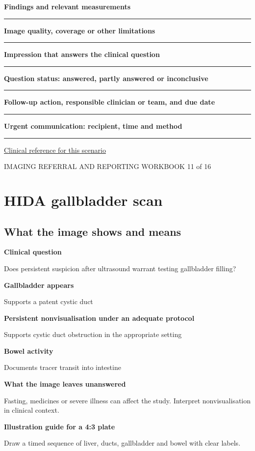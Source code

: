 \documentclass[11pt,a4paper]{article}
\newcommand{\record}[1]{\textbf{#1}\par\vspace{0.55\baselineskip}\hrule\vspace{0.35\baselineskip}}
\begin{document}
\record{Findings and relevant measurements}

\record{Image quality, coverage or other limitations}

\record{Impression that answers the clinical question}

\record{Question status: answered, partly answered or inconclusive}

\record{Follow-up action, responsible clinician or team, and due date}

\record{Urgent communication: recipient, time and method}

\small\href{https://www.radiologyinfo.org/en/info/acs-right-upper-quadrant-pain}{Clinical reference for this scenario}

\normalsize

\newpage

{\small IMAGING REFERRAL AND REPORTING WORKBOOK \hfill 11 of 16}

\section*{HIDA gallbladder scan}

\subsection*{What the image shows and means}

\textbf{Clinical question}\par Does persistent suspicion after ultrasound warrant testing gallbladder filling?\par

\textbf{Gallbladder appears}\par Supports a patent cystic duct\par

\textbf{Persistent nonvisualisation under an adequate protocol}\par Supports cystic duct obstruction in the appropriate setting\par

\textbf{Bowel activity}\par Documents tracer transit into intestine\par

\textbf{What the image leaves unanswered}\par Fasting, medicines or severe illness can affect the study. Interpret nonvisualisation in clinical context.\par

\textbf{Illustration guide for a 4:3 plate}\par Draw a timed sequence of liver, ducts, gallbladder and bowel with clear labels.\par
\end{document}
